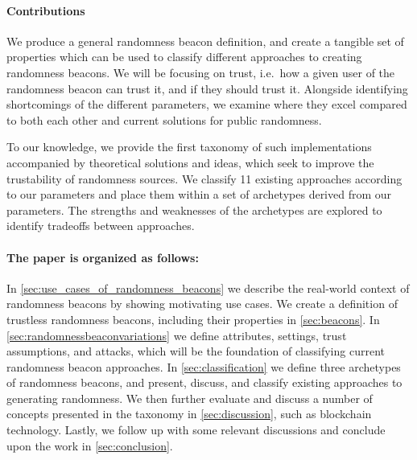 \paragraph{Contributions}\label{subsec:contributions}
We produce a general randomness beacon definition, and create a tangible set of properties which can be used to classify different approaches to creating randomness beacons.
We will be focusing on trust, i.e.\ how a given user of the randomness beacon can trust it, and if they should trust it.
Alongside identifying shortcomings of the different parameters, we examine where they excel compared to both each other and current solutions for public randomness.

To our knowledge, we provide the first taxonomy of such implementations accompanied by theoretical solutions and ideas, which seek to improve the trustability of randomness sources.
We classify 11 existing approaches according to our parameters and place them within a set of archetypes derived from our parameters. The strengths and weaknesses of the archetypes are explored to identify tradeoffs between approaches.


\paragraph{The paper is organized as follows:}
In \cref{sec:use_cases_of_randomness_beacons} we describe the real-world context of randomness beacons by showing motivating use cases.
We create a definition of trustless randomness beacons, including their properties in \cref{sec:beacons}. In \cref{sec:randomnessbeaconvariations} we define attributes, settings, trust assumptions, and attacks, which will be the foundation of classifying current randomness beacon approaches.
In \cref{sec:classification} we define three archetypes of randomness beacons, and present, discuss, and classify existing approaches to generating randomness.
We then further evaluate and discuss a number of concepts presented in the taxonomy in \cref{sec:discussion}, such as blockchain technology.
Lastly, we follow up with some relevant discussions and conclude upon the work in \cref{sec:conclusion}.
